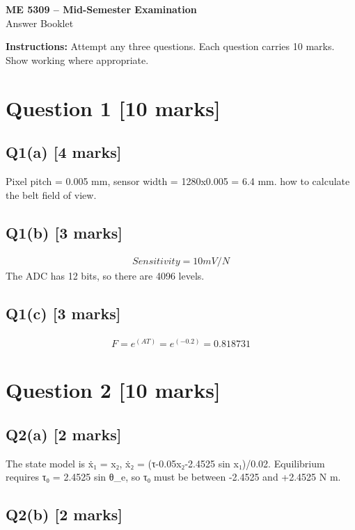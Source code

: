 \documentclass[11pt,a4paper]{article}
\begin{document}
\begin{center}
{\Large\bfseries ME 5309 -- Mid-Semester Examination}\\[3pt]
{\large Answer Booklet}\\[8pt]
\end{center}
\textbf{Instructions:} Attempt any three questions. Each question carries 10 marks. Show working where appropriate.
\section*{Question 1 \hfill [10 marks]}
\subsection*{Q1(a) \hfill [4 marks]}

Pixel pitch = 0.005 mm, sensor width = 1280x0.005 = 6.4 mm. how to calculate the belt field of view.

\subsection*{Q1(b) \hfill [3 marks]}

\[\begin{aligned}Sensitivity = 10 mV/N\end{aligned}\]
The ADC has 12 bits, so there are 4096 levels.

\subsection*{Q1(c) \hfill [3 marks]}

\[\begin{aligned}F = e^(AT) = e^(-0.2) = 0.818731\end{aligned}\]

\section*{Question 2 \hfill [10 marks]}
\subsection*{Q2(a) \hfill [2 marks]}

The state model is ẋ₁ = x₂, ẋ₂ = (τ-0.05x₂-2.4525 sin x₁)/0.02.
Equilibrium requires τ₀ = 2.4525 sin θ\_e, so τ₀ must be between -2.4525 and +2.4525 N m.

\subsection*{Q2(b) \hfill [2 marks]}
\end{document}
